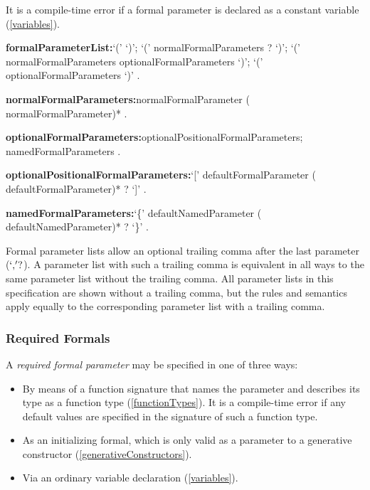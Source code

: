 \documentclass{article}
\begin{document}


\LMHash{}
It is a compile-time error if a formal parameter is declared as a constant variable (\ref{variables}).

\begin{grammar}
{\bf formalParameterList:}`(' `)';
  `(' normalFormalParameters \gcomma{}? `)';
  `(' normalFormalParameters \gcomma{} optionalFormalParameters `)';
  `(' optionalFormalParameters `)'
  .

{\bf normalFormalParameters:}normalFormalParameter (\gcomma{} normalFormalParameter)*
  .

{\bf optionalFormalParameters:}optionalPositionalFormalParameters;
  namedFormalParameters
  .

{\bf optionalPositionalFormalParameters:}`[' defaultFormalParameter (\gcomma{} defaultFormalParameter)* \gcomma{}? `]'
  .

{\bf namedFormalParameters:}`\{' defaultNamedParameter (\gcomma{} defaultNamedParameter)* \gcomma{}? `\}'
  .
\end{grammar}

Formal parameter lists allow an optional trailing comma after the last parameter ($`,\!'?$).
A parameter list with such a trailing comma is equivalent in all ways to the same parameter list without the trailing comma.
All parameter lists in this specification are shown without a trailing comma, but the rules and semantics apply equally to the corresponding parameter list with a trailing comma.


\subsubsection{Required Formals}

\LMHash{}
A {\em required formal parameter} may be specified in one of three ways:
\begin{itemize}
\item By means of a function signature that names the parameter and describes its type as a function type (\ref{functionTypes}).
It is a compile-time error if any default values are specified in the signature of such a function type.%
\item As an initializing formal, which is only valid as a parameter to a generative constructor (\ref{generativeConstructors}). %
\item Via an ordinary variable declaration (\ref{variables}).
\end{itemize}
\end{document}
